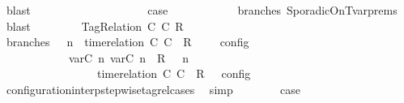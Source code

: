 \begin{isabellebody}
\ blast\isanewline
\ \ \ \ \ \ \ \ \isamarkupfalse%
\isanewline
\ \ \ \ \ \ \ \ \isamarkupfalse%
\ \isamarkupfalse%
\ {\isacharquery}case\isanewline
\ \ \ \ \ \ \ \ \ \ \isamarkupfalse%
\ branches\ SporadicOnTvar{\isachardot}prems{\isacharparenleft}{}{\isacharparenright}\ \isamarkupfalse%
\ blast\isanewline
\ \ \isamarkupfalse%
\isanewline
\ \ \ \ \isamarkupfalse%
\ {\isacharparenleft}TagRelation\ C\ C\ R{\isacharparenright}\isanewline
\ \ \ \ \ \ \isamarkupfalse%
\ branches{\isacharcolon}\ {\isacartoucheopen}{\isasymlbrakk}\ {\isasymGamma}{\isacharcomma}\ n\ {\isasymturnstile}\ {\isacharparenleft}{\isacharparenleft}time{\isacharminus}relation\ {\isasymlfloor}C\ C\ {\isasymin}\ R{\isacharparenright}\ {\isacharhash}\ {\isasymPsi}{\isacharparenright}\ {\isasymtriangleright}\ {\isasymPhi}\ {\isasymrbrakk}\isactrlsub c\isactrlsub o\isactrlsub n\isactrlsub f\isactrlsub i\isactrlsub g\isanewline
\ \ \ \ \ \ \ \ \ \ {\isacharequal}\ {\isasymlbrakk}\ {\isacharparenleft}{\isacharparenleft}{\isasymlfloor}{\isasymtau}\isactrlsub v\isactrlsub a\isactrlsub r{\isacharparenleft}C\ n{\isacharparenright}{\isacharcomma}\ {\isasymtau}\isactrlsub v\isactrlsub a\isactrlsub r{\isacharparenleft}C\ n{\isacharparenright}{\isasymrfloor}\ {\isasymin}\ R{\isacharparenright}\ {\isacharhash}\ {\isasymGamma}{\isacharparenright}{\isacharcomma}\ n\isanewline
\ \ \ \ \ \ \ \ \ \ \ \ \ \ {\isasymturnstile}\ {\isasymPsi}\ {\isasymtriangleright}\ {\isacharparenleft}{\isacharparenleft}time{\isacharminus}relation\ {\isasymlfloor}C\ C\ {\isasymin}\ R{\isacharparenright}\ {\isacharhash}\ {\isasymPhi}{\isacharparenright}\ {\isasymrbrakk}\isactrlsub c\isactrlsub o\isactrlsub n\isactrlsub f\isactrlsub i\isactrlsub g{\isacartoucheclose}\isanewline
\ \ \ \ \ \ \ \ \isamarkupfalse%
\ configuration{\isacharunderscore}interp{\isacharunderscore}stepwise{\isacharunderscore}tagrel{\isacharunderscore}cases\ \isamarkupfalse%
\ simp\isanewline
\ \ \ \ \ \ \isamarkupfalse%
\ {\isacharquery}case\isanewline
\ \ \ \ \ \ \isamarkupfalse%
\ {\isacharminus}\isanewline
\ \ \ \ \ \ \ \ \isamarkupfalse%

\end{isabellebody}
